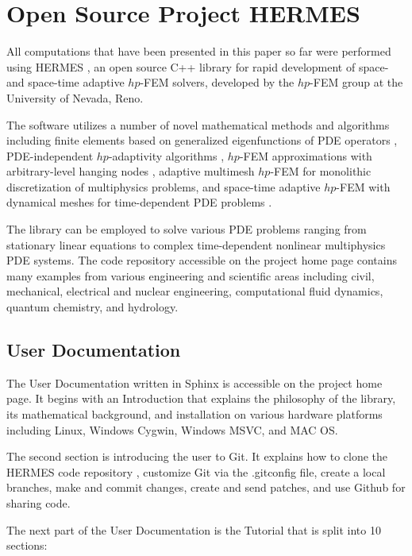 \documentclass[final,3p,times,twocolumn]{elsarticle}
\begin{document}
\section{Open Source Project HERMES}
\label{sec:hermes}

All computations that have been presented in this paper so far 
were performed using HERMES \cite{hermes}, 
an open source C++ library for rapid development of space- and 
space-time adaptive $hp$-FEM solvers, developed by the $hp$-FEM group 
at the University of Nevada, Reno.  

The software utilizes a number of novel mathematical methods and 
algorithms including finite elements based on generalized eigenfunctions 
of PDE operators \cite{eigen,hermite}, 
PDE-independent $hp$-adaptivity algorithms \cite{pdeindep}, 
$hp$-FEM approximations with arbitrary-level hanging nodes \cite{hangno-1,hangno-2}, 
adaptive multimesh $hp$-FEM  for monolithic discretization of 
multiphysics problems, and
space-time adaptive $hp$-FEM with dynamical meshes for time-dependent PDE problems 
\cite{spacetime-1,spacetime-2}. 

The library can be employed to solve various PDE problems ranging 
from stationary linear equations to complex 
time-dependent nonlinear multiphysics PDE systems. The code repository \cite{hermes-repo}
accessible on the project home page contains many examples from various 
engineering and scientific areas including civil, mechanical, 
electrical and nuclear engineering, computational fluid dynamics, 
quantum chemistry, and hydro\-lo\-gy.

\subsection{User Documentation}

The User Documentation %
written in Sphinx
is accessible on the project home page. It begins with an Introduction that explains the 
philosophy of the library, its mathematical background, and installation
on various hardware platforms including Linux, Windows Cygwin, Windows MSVC,
and MAC OS. 

The second section is introducing the user to Git. It explains how to 
clone the HERMES code repository \cite{hermes-repo}, customize Git via the .gitconfig file, 
create a local branches, make and commit changes, create and send patches,
and use Github for sharing code. 

The next part of the User Documentation is the Tutorial that is split 
into 10 sections:
\end{document}
